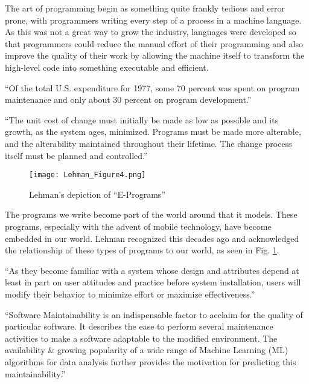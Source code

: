 \documentclass[12pt,letterpaper]{report}
\begin{document}
\cleardoublepage%
{}


The art of programming begin as something quite frankly tedious and error prone, with programmers writing every step of a process in a machine language. As this was not a great way to grow the industry, languages were developed so that programmers could reduce the manual effort of their programming and also improve the quality of their work by allowing the machine itself to transform the high-level code into something executable and efficient. \cite{lehman:1980}

``Of the total U.S. expenditure for 1977, some 70 percent was spent on program maintenance and only about 30 percent on program development.'' \cite{lehman:1980}

``The unit cost of change must initially be made as low as possible and its growth, as the system ages, minimized. Programs must be made more alterable, and the alterability maintained throughout their lifetime. The change process itself must be planned and controlled.'' \cite{lehman:1980}

\begin{figure}[ht]
  \centerline{
      \texttt{[image: Lehman\_Figure4.png]}
  }
  \caption{Lehman's depiction of ``E-Programs'' \cite{lehman:1980}}
  \label{figEPrograms}
\end{figure}

The programs we write become part of the world around that it models. These programs, especially with the advent of mobile technology, have become embedded in our world. Lehman recognized this decades ago and acknowledged the relationship of these types of programs to our world, as seen in Fig. \ref{figEPrograms}. \cite{lehman:1980}

``As they become familiar with a system whose design and attributes depend at least in part on user attitudes and practice before system installation, users will modify their behavior to minimize effort or maximize effectiveness.'' \cite{lehman:1980}

``Software Maintainability is an indispensable factor to acclaim for the quality of particular software. It describes the ease to perform several maintenance activities to make a software adaptable to the modified environment. The availability \& growing popularity of a wide range of Machine Learning (ML) algorithms for data analysis further provides the motivation for predicting this maintainability.'' \cite{gupta:2021}
\end{document}
